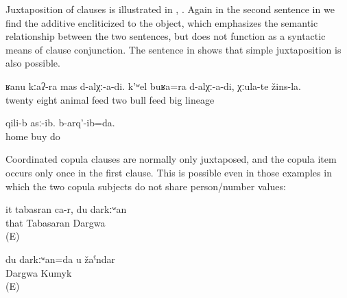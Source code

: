 Juxtaposition of clauses is illustrated in , . Again in the second sentence in  we find the additive  encliticized to the object, which emphasizes the semantic relationship between the two sentences, but does not function as a syntactic means of clause conjunction. The sentence in  shows that simple juxtaposition is also possible.
%
\begin{exe}
	\ex	\label{ex:We fed 28 animals, and we also fed two good (lit. big) breeding bulls.}
	\gll	ʁanu	kːaʔ-ra	mas	d-alχː-a-di.	k'ʷel	buʁa=ra d-alχː-a-di,	χːula-te	žins-la.\\
		twenty	eight	animal	feed two	bull	feed	big 	lineage\\
	\glt	{}

	\ex	\label{ex:‎They bought (the medicine) at home and I did (the cure)}
	\gll	qili-b	asː-ib.	b-arq'-ib=da.\\
		home	buy	do\\
	\glt	{} %
\end{exe}

Coordinated copula clauses are normally only juxtaposed, and the copula item occurs only once in the first clause. This is possible even in those examples in which the two copula subjects do not share person/number values:
%
\begin{exe}
	\ex	\label{ex:‎‎She is Tabasaran, I (am) Dargwa}
	\gll	it	tabasran	ca-r,		du	darkːʷan\\
		that	Tabasaran			Dargwa\\
	\glt	{} (E)

	\ex	\label{ex:‎‎I am Dargwa, you (are) Kumyk}
	\gll	du	darkːʷan=da		u	žaˁndar\\
			Dargwa			Kumyk\\
	\glt	{} (E)
\end{exe}

